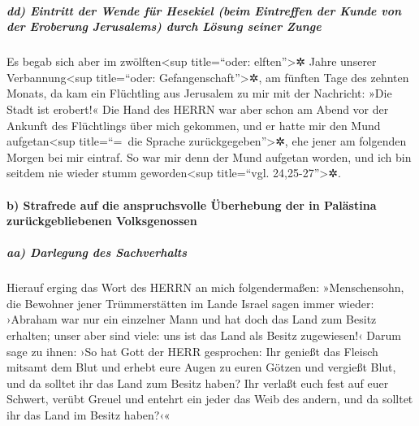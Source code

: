 \hypertarget{dd-eintritt-der-wende-fuxfcr-hesekiel-beim-eintreffen-der-kunde-von-der-eroberung-jerusalems-durch-luxf6sung-seiner-zunge}{%
\subparagraph{dd) Eintritt der Wende für Hesekiel (beim Eintreffen der
Kunde von der Eroberung Jerusalems) durch Lösung seiner
Zunge}\label{dd-eintritt-der-wende-fuxfcr-hesekiel-beim-eintreffen-der-kunde-von-der-eroberung-jerusalems-durch-luxf6sung-seiner-zunge}}

Es begab sich aber im zwölften\textless sup title=``oder:
elften''\textgreater✲ Jahre unserer Verbannung\textless sup
title=``oder: Gefangenschaft''\textgreater✲, am fünften Tage des zehnten
Monats, da kam ein Flüchtling aus Jerusalem zu mir mit der Nachricht:
»Die Stadt ist erobert!« Die Hand des HERRN war aber
schon am Abend vor der Ankunft des Flüchtlings über mich gekommen, und
er hatte mir den Mund aufgetan\textless sup title=``=~die Sprache
zurückgegeben''\textgreater✲, ehe jener am folgenden Morgen bei mir
eintraf. So war mir denn der Mund aufgetan worden, und ich bin seitdem
nie wieder stumm geworden\textless sup title=``vgl.
24,25-27''\textgreater✲.

\hypertarget{b-strafrede-auf-die-anspruchsvolle-uxfcberhebung-der-in-paluxe4stina-zuruxfcckgebliebenen-volksgenossen}{%
\paragraph{b) Strafrede auf die anspruchsvolle Überhebung der in
Palästina zurückgebliebenen
Volksgenossen}\label{b-strafrede-auf-die-anspruchsvolle-uxfcberhebung-der-in-paluxe4stina-zuruxfcckgebliebenen-volksgenossen}}

\hypertarget{aa-darlegung-des-sachverhalts}{%
\subparagraph{aa) Darlegung des
Sachverhalts}\label{aa-darlegung-des-sachverhalts}}

Hierauf erging das Wort des HERRN an mich folgendermaßen:
»Menschensohn, die Bewohner jener Trümmerstätten im Lande
Israel sagen immer wieder: ›Abraham war nur ein einzelner Mann und hat
doch das Land zum Besitz erhalten; unser aber sind viele: uns ist das
Land als Besitz zugewiesen!‹ Darum sage zu ihnen: ›So hat
Gott der HERR gesprochen: Ihr genießt das Fleisch mitsamt dem Blut und
erhebt eure Augen zu euren Götzen und vergießt Blut, und da solltet ihr
das Land zum Besitz haben? Ihr verlaßt euch fest auf euer
Schwert, verübt Greuel und entehrt ein jeder das Weib des andern, und da
solltet ihr das Land im Besitz haben?‹«

